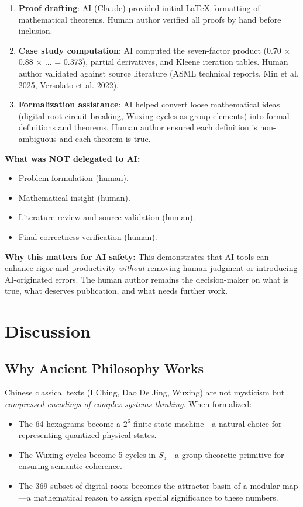 \documentclass[twocolumn]{article}
\begin{document}
\begin{enumerate}
  \item \textbf{Proof drafting}: AI (Claude) provided initial LaTeX formatting of mathematical theorems. Human author verified all proofs by hand before inclusion.
  \item \textbf{Case study computation}: AI computed the seven-factor product (0.70 × 0.88 × ... = 0.373), partial derivatives, and Kleene iteration tables. Human author validated against source literature (ASML technical reports, Min et al. 2025, Versolato et al. 2022).
  \item \textbf{Formalization assistance}: AI helped convert loose mathematical ideas (digital root circuit breaking, Wuxing cycles as group elements) into formal definitions and theorems. Human author ensured each definition is non-ambiguous and each theorem is true.
\end{enumerate}

\textbf{What was NOT delegated to AI:}
\begin{itemize}
  \item Problem formulation (human).
  \item Mathematical insight (human).
  \item Literature review and source validation (human).
  \item Final correctness verification (human).
\end{itemize}

\textbf{Why this matters for AI safety:} This demonstrates that AI tools can enhance rigor and productivity \emph{without} removing human judgment or introducing AI-originated errors. The human author remains the decision-maker on what is true, what deserves publication, and what needs further work.

\section{Discussion}

\subsection{Why Ancient Philosophy Works}

Chinese classical texts (I Ching, Dao De Jing, Wuxing) are not mysticism but \emph{compressed encodings of complex systems thinking}. When formalized:

\begin{itemize}
  \item The 64 hexagrams become a $2^6$ finite state machine—a natural choice for representing quantized physical states.
  \item The Wuxing cycles become 5-cycles in $S_5$—a group-theoretic primitive for ensuring semantic coherence.
  \item The 369 subset of digital roots becomes the attractor basin of a modular map—a mathematical reason to assign special significance to these numbers.
\end{itemize}
\end{document}
